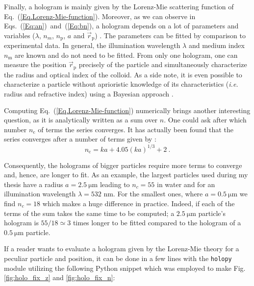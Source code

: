 Finally, a hologram is mainly given by the Lorenz-Mie scattering function of Eq.~(\ref{Eq.Lorenz-Mie-function}). Moreover, as we can observe in Eqs.~(\ref{Eq:an})~and~(\ref{Eq:bn}), a hologram depends on a lot of parameters and variables ($\lambda$, $n_m$, $n_\mathrm{p}$, $a$ and $\vec{r}_\mathrm{p}$) . The parameters can be fitted by comparison to experimental data. In general, the illumination wavelength $\lambda$ and medium index $n_\mathrm{m}$ are known and do not need to be fitted. From only one hologram, one can measure  the position $\vec{r}_\mathrm{p}$ precisely of the particle and simultaneously characterize the radius and optical index of the colloid. As a side note, it is even possible to characterize a particle without aprioristic knowledge of its characteristics (\textit{i.e.} radius and refractive index) using a Bayesian approach \cite{gregory_bayesian_2005, dimiduk_bayesian_2016}.

Computing Eq.~(\ref{Eq.Lorenz-Mie-function}) numerically brings another interesting question, as it is analytically written as a sum over $n$. One could ask after which number $n_\mathrm{c}$ of terms the series converges. It has actually been found that the series converges after a number of terms given by \cite{lentz_generating_1976}:
\begin{equation}
	n_\mathrm{c} = k a + 4.05 (k a)^{1/3} + 2 ~.
\end{equation}

Consequently, the holograms of bigger particles require more terms to converge and, hence, are longer to fit. As an example, the largest particles used during my thesis have a radius $a = 2.5 ~ \mathrm{\mu m}$ leading to $ n_c = 55$ in water and for an illumination wavelength $\lambda = 532$ nm. For the smallest ones, where $a = 0.5 ~ \mathrm{\mu m}$ we find $n_c = 18$ which makes a huge difference in practice. Indeed, if each of the terms of the sum takes the same time to be computed; a $2.5 ~ \mathrm{\mu m}$ particle's hologram is $55/18 \simeq 3$ times longer to be fitted compared to the hologram of a $0.5 ~ \mathrm{\mu m}$ particle.

If a reader wants to evaluate a hologram given by the Lorenz-Mie theory for a peculiar particle and position, it can be done in a few lines with the \texttt{holopy} module utilizing the following Python snippet which was employed to make Fig.\ref{fig:holo_fix_z} and \ref{fig:holo_fix_n}:

